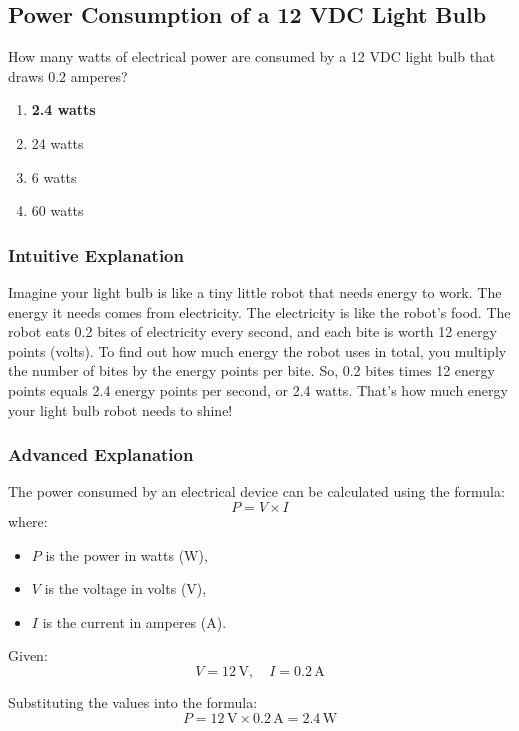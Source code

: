 \subsection{Power Consumption of a 12 VDC Light Bulb}
\label{G5B04}

\begin{tcolorbox}[colback=gray!10!white,colframe=black!75!black,title=G5B04]
How many watts of electrical power are consumed by a 12 VDC light bulb that draws 0.2 amperes?
\begin{enumerate}[label=\Alph*),noitemsep]
    \item \textbf{2.4 watts}
    \item 24 watts
    \item 6 watts
    \item 60 watts
\end{enumerate}
\end{tcolorbox}

\subsubsection{Intuitive Explanation}
Imagine your light bulb is like a tiny little robot that needs energy to work. The energy it needs comes from electricity. The electricity is like the robot's food. The robot eats 0.2 bites of electricity every second, and each bite is worth 12 energy points (volts). To find out how much energy the robot uses in total, you multiply the number of bites by the energy points per bite. So, 0.2 bites times 12 energy points equals 2.4 energy points per second, or 2.4 watts. That's how much energy your light bulb robot needs to shine!

\subsubsection{Advanced Explanation}
The power consumed by an electrical device can be calculated using the formula:
\[
P = V \times I
\]
where:
\begin{itemize}
    \item \( P \) is the power in watts (W),
    \item \( V \) is the voltage in volts (V),
    \item \( I \) is the current in amperes (A).
\end{itemize}

Given:
\[
V = 12 \, \text{V}, \quad I = 0.2 \, \text{A}
\]

Substituting the values into the formula:
\[
P = 12 \, \text{V} \times 0.2 \, \text{A} = 2.4 \, \text{W}
\]


